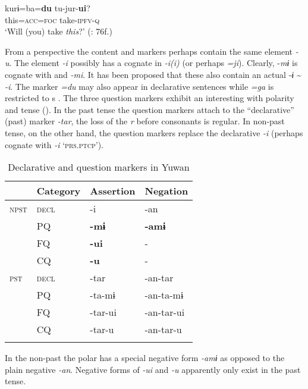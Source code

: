     \ex
    \gll kurɨ=ba=\textbf{{du}} tu-jur-\textbf{{ui}}?\\
    this=\textsc{acc}=\textsc{foc} take-\textsc{ipfv}-\textsc{q}\\
    \glt ‘Will (you) take \textit{this}?’ (\citealt{Niinaga2010}: 76f.)
    \z
    \z 

From a  perspective the content and  markers perhaps contain the same element \textit{-u}. The element \textit{-i} possibly has a cognate in  \textit{-i(i)} (or perhaps \textit{=ji}). Clearly,  -\textit{mɨ} is cognate with  and  \textit{-mi}. It has been proposed that these also contain an actual  -\textit{ɨ} {\textasciitilde} \textit{-i}. The  marker \textit{=du} may also appear in declarative sentences while \textit{=ga} is restricted to s \citep[75]{Niinaga2010}. The three question markers exhibit an interesting  with polarity and tense (). In the past tense the question markers attach to the “declarative” (past) marker \textit{-tar}, the loss of the \textit{r} before consonants is regular. In non-past tense, on the other hand, the question markers replace the declarative \textit{-i} (perhaps cognate with  \textit{-i} ‘\textsc{prs.ptcp}’).

\begin{table}
\caption{Declarative and question markers in Yuwan \citep[64]{Niinaga2010}}
\label{tab:japa:1}

\begin{tabularx}{\textwidth}{XXXl}
\lsptoprule
& \textbf{Category} & \textbf{Assertion} & \textbf{Negation}\\
\midrule
\textsc{npst} & \textsc{decl} & -i & -an\\
& PQ & \textbf{-mɨ} & \textbf{-amɨ}\\
& FQ & \textbf{-ui} & -\\
& CQ & \textbf{-u} & -\\
\textsc{pst} & \textsc{decl} & -tar & -an-tar\\
& PQ & -ta-mɨ & -an-ta-mɨ\\
& FQ & -tar-ui & -an-tar-ui\\
& CQ & -tar-u & -an-tar-u\\
\lspbottomrule
\end{tabularx}
\end{table}

In the non-past the polar  has a special negative form \textit{-amɨ} as opposed to the plain negative \textit{-an}. Negative forms of \textit{-ui} and \textit{-u} apparently only exist in the past tense.

